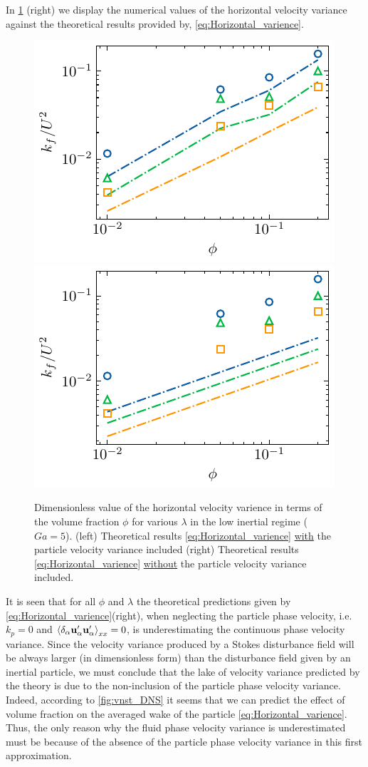 In \ref{fig:uuxx} (right) we display the numerical values of the horizontal velocity variance against the theoretical results provided by, \ref{eq:Horizontal_varience}. 
\begin{figure}
    \centering
    \includegraphics[height = 0.25\textwidth]{image/HOMOGENEOUS_final/CA/UUxx2_Ga_5.pdf}
    \includegraphics[height = 0.25\textwidth]{image/HOMOGENEOUS_final/CA/UUxx_Ga_5.pdf}
    \caption{Dimensionless value of the horizontal velocity varience  in terms of the volume fraction $\phi$ for various $\lambda$ in the low inertial regime ($Ga = 5$). 
    (left) Theoretical results \eqref{eq:Horizontal_varience} \underline{with} the particle velocity variance included
    (right) Theoretical results  \eqref{eq:Horizontal_varience} \underline{without} the particle velocity variance included. 
    }
    \label{fig:uuxx}
\end{figure}
It is seen that for all $\phi$ and $\lambda$ the theoretical predictions given by \ref{eq:Horizontal_varience}(right), when neglecting the particle phase velocity, i.e.  $k_p =0$ and $ \left<\delta_\alpha \textbf{u}_\alpha'\textbf{u}_\alpha'\right>_{xx} = 0 $, is underestimating the continuous phase velocity variance. 
Since the velocity variance produced by a Stokes disturbance field will be always larger (in dimensionless form) than the disturbance field given by an inertial particle, we must conclude that the lake of velocity variance predicted by the theory is due to the non-inclusion of the particle phase velocity variance. 
Indeed, according to \ref{fig:vnst_DNS} it seems that we can predict the effect of volume fraction on the averaged wake of the particle \eqref{eq:Horizontal_varience}.
Thus, the only reason why the fluid phase velocity variance is underestimated must be because of the absence of the particle phase velocity variance in this first approximation.  

